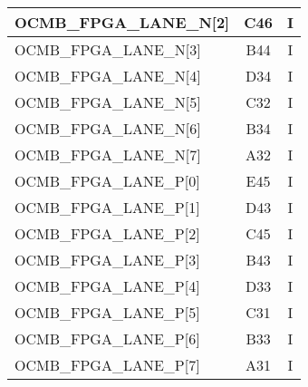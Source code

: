\begin{longtable}[l]{| l | c | c |}
  OCMB\_FPGA\_LANE\_N[2]       & C46  & I   \\ \hline
  OCMB\_FPGA\_LANE\_N[3]       & B44  & I   \\ \hline
  OCMB\_FPGA\_LANE\_N[4]       & D34  & I   \\ \hline
  OCMB\_FPGA\_LANE\_N[5]       & C32  & I   \\ \hline
  OCMB\_FPGA\_LANE\_N[6]       & B34  & I   \\ \hline
  OCMB\_FPGA\_LANE\_N[7]       & A32  & I   \\ \hline
  OCMB\_FPGA\_LANE\_P[0]       & E45  & I   \\ \hline
  OCMB\_FPGA\_LANE\_P[1]       & D43  & I   \\ \hline
  OCMB\_FPGA\_LANE\_P[2]       & C45  & I   \\ \hline
  OCMB\_FPGA\_LANE\_P[3]       & B43  & I   \\ \hline
  OCMB\_FPGA\_LANE\_P[4]       & D33  & I   \\ \hline
  OCMB\_FPGA\_LANE\_P[5]       & C31  & I   \\ \hline
  OCMB\_FPGA\_LANE\_P[6]       & B33  & I   \\ \hline
  OCMB\_FPGA\_LANE\_P[7]       & A31  & I   \\ \hline
\end{longtable}

